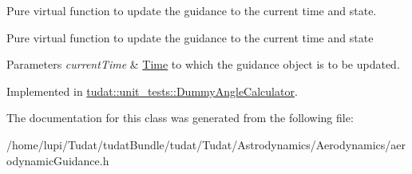 Pure virtual function to update the guidance to the current time and state. 

Pure virtual function to update the guidance to the current time and state 
\begin{DoxyParams}{Parameters}
{\em current\+Time} & \hyperlink{classtudat_1_1Time}{Time} to which the guidance object is to be updated. \\
\hline
\end{DoxyParams}


Implemented in \hyperlink{classtudat_1_1unit__tests_1_1DummyAngleCalculator_ac7c9dc1b0ab06c0807c368b44665bf2e}{tudat\+::unit\+\_\+tests\+::\+Dummy\+Angle\+Calculator}.



The documentation for this class was generated from the following file\+:\begin{DoxyCompactItemize}
\item 
/home/lupi/\+Tudat/tudat\+Bundle/tudat/\+Tudat/\+Astrodynamics/\+Aerodynamics/aerodynamic\+Guidance.\+h\end{DoxyCompactItemize}
